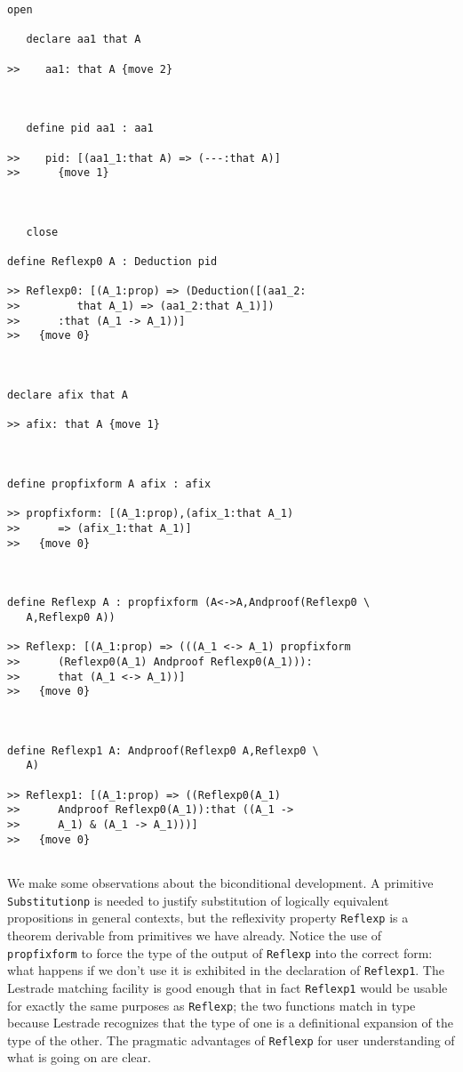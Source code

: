 \documentclass[12pt]{article}
\begin{document}
\begin{verbatim}
open

   declare aa1 that A

>>    aa1: that A {move 2}



   define pid aa1 : aa1

>>    pid: [(aa1_1:that A) => (---:that A)]
>>      {move 1}



   close

define Reflexp0 A : Deduction pid

>> Reflexp0: [(A_1:prop) => (Deduction([(aa1_2:
>>         that A_1) => (aa1_2:that A_1)])
>>      :that (A_1 -> A_1))]
>>   {move 0}



declare afix that A

>> afix: that A {move 1}



define propfixform A afix : afix

>> propfixform: [(A_1:prop),(afix_1:that A_1)
>>      => (afix_1:that A_1)]
>>   {move 0}



define Reflexp A : propfixform (A<->A,Andproof(Reflexp0 \
   A,Reflexp0 A))

>> Reflexp: [(A_1:prop) => (((A_1 <-> A_1) propfixform
>>      (Reflexp0(A_1) Andproof Reflexp0(A_1))):
>>      that (A_1 <-> A_1))]
>>   {move 0}



define Reflexp1 A: Andproof(Reflexp0 A,Reflexp0 \
   A)

>> Reflexp1: [(A_1:prop) => ((Reflexp0(A_1)
>>      Andproof Reflexp0(A_1)):that ((A_1 ->
>>      A_1) & (A_1 -> A_1)))]
>>   {move 0}


\end{verbatim}

We make some observations about the biconditional development.  A primitive {\tt Substitutionp} is needed to justify substitution of logically equivalent propositions in general contexts, but the reflexivity property {\tt Reflexp} is a theorem derivable from primitives we have already.  Notice the use of {\tt propfixform} to force the type of the output of {\tt Reflexp} into the correct form:  what happens if we don't use it is exhibited in  the declaration of {\tt Reflexp1}.  The Lestrade matching facility is good enough that in fact {\tt Reflexp1} would be usable for exactly the same purposes as {\tt Reflexp};  the two functions match in type because Lestrade recognizes that the type of one is a definitional expansion of the type of the other.  The pragmatic advantages of {\tt Reflexp} for user understanding of what is going on are clear.
\end{document}

